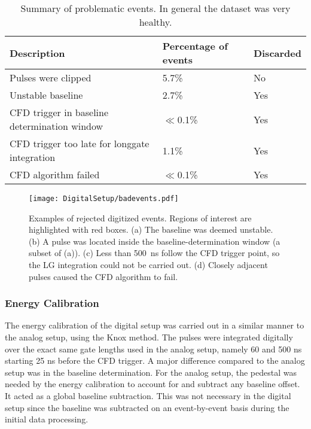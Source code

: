 \documentclass[main.tex]{subfiles}
\begin{document}
\begin{table}[]
\begin{tabular}{|l|l|l|}
\hline
Description                          & Percentage of events & Discarded \\ \hline
Pulses were clipped                           & 5.7\%                          & No                 \\ \hline
Unstable baseline                             & 2.7\%                        & Yes                \\ \hline
CFD trigger in baseline determination window  & $\ll$0.1\%                      & Yes                \\ \hline
CFD trigger too late for longgate integration & 1.1\%                         & Yes                \\ \hline
CFD algorithm failed                          & $\ll$0.1\%                    & Yes                \\ \hline

\end{tabular}
\caption[Summary of problematic events.]{Summary of problematic events. In general the dataset was very healthy.}
\label{tab:badevents}
\end{table}

\begin{figure}[ht!]
    \centering
        \texttt{[image: DigitalSetup/badevents.pdf]}
        \caption[Examples of rejected digitized events]{Examples of rejected digitized events. Regions of interest are highlighted with red boxes. (a) The baseline was deemed unstable. (b) A pulse was located inside the baseline-determination window (a subset of (a)). (c) Less than \SI{500}{ns} follow the CFD trigger point, so the LG integration could not be carried out. (d) Closely adjacent pulses caused the CFD algorithm to fail.}
    \label{fig:badevents} 
\end{figure}
\newpage
\subsubsection{Energy Calibration}\label{sec:Ecal_D}
The energy calibration of the digital setup was carried out in a similar manner to the analog setup, using the Knox method. The pulses were integrated digitally over the exact same gate lengths used in the analog setup, namely 60 and 500 ns starting 25 ns before the CFD trigger. A major difference compared to the analog setup was in the baseline determination. For the analog setup, the pedestal was needed by the energy calibration to account for and subtract any baseline offset. It acted as a global baseline subtraction. This was not necessary in the digital setup since the baseline was subtracted on an event-by-event basis during the initial data processing. 
\end{document}
